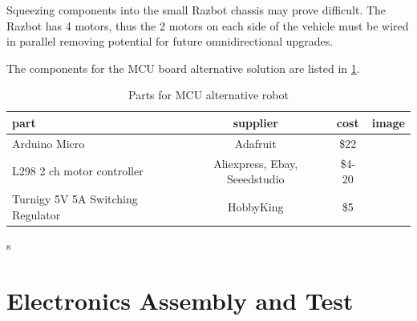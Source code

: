 \documentclass[12pt,titlepage,oneside]{memoir}
\begin{document}
Squeezing components into the small Razbot chassis may prove difficult. The Razbot has 4 motors, thus the 2 motors on each side of the vehicle must be wired in parallel removing potential for future omnidirectional upgrades.

The components for the MCU board alternative solution are listed in \ref{table:altparts}.

\begin{table}[!h]
\begin{tabular}{p{5cm} | c | c | c }
part  & supplier  & cost & image \\
\hline
Arduino Micro & Adafruit &  \$22 & \\
L298 2 ch motor controller & Aliexpress, Ebay, Seeedstudio &  \$4-20 & \\
Turnigy 5V 5A Switching Regulator & HobbyKing &  \$5 & \\

\end{tabular}s
\caption{Parts for MCU alternative robot}
\label{table:altparts}
\end{table}


\section{Electronics Assembly and Test}
\end{document}
